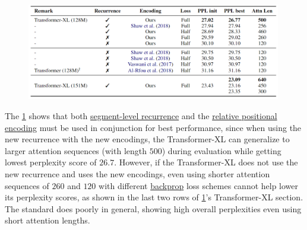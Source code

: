 \begin{figure}[h]
\vspace{-5pt}
\centering
\includegraphics[width=0.99\textwidth]{imgs/table_transXL_ablationREC.png}
\vspace{-5pt}
\vspace{-5pt}
\label{tbl:transXL_ablationRECURR}
\end{figure}


The \cref{tbl:transXL_ablationRECURR} shows that both \hyperref[sec:SegmentLevelRec]{segment-level recurrence} and the \hyperref[sec:RelativePosEnc]{relative positional encoding} must be used in conjunction for best performance, since when using the new recurrence with the new encodings, the Transformer-XL can generalize to larger attention sequences (with length $500$) during evaluation while getting lowest perplexity score of $26.7$. However, if the Transformer-XL does not use the new recurrence and uses the new encodings, even using shorter attention sequences of $260$ and $120$ with different \hyperref[sec:BackwardProp]{backprop} loss schemes cannot help lower its perplexity scores, as shown in the last two rows of \cref{tbl:transXL_ablationRECURR}'s Transformer-XL section. The standard  does poorly in general, showing high overall perplexities even using short attention lengths. 
